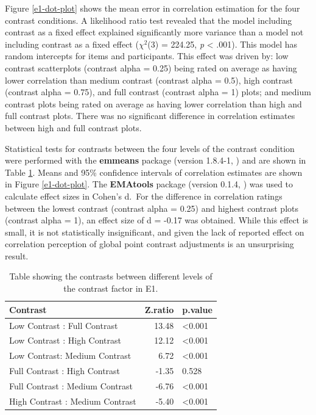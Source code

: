 \documentclass[preprint, 3p,
authoryear]{elsarticle} %
\begin{document}
Figure \ref{e1-dot-plot} shows the mean error in correlation estimation
for the four contrast conditions. A likelihood ratio test revealed that
the model including contrast as a fixed effect explained significantly
more variance than a model not including contrast as a fixed effect
(\(\chi^2\)(3) = 224.25, \emph{p} \textless{} .001). This model has
random intercepts for items and participants. This effect was driven by:
low contrast scatterplots (contrast alpha = 0.25) being rated on average
as having lower correlation than medium contrast (contrast alpha = 0.5),
high contrast (contrast alpha = 0.75), and full contrast (contrast alpha
= 1) plots; and medium contrast plots being rated on average as having
lower correlation than high and full contrast plots. There was no
significant difference in correlation estimates between high and full
contrast plots.

Statistical tests for contrasts between the four levels of the contrast
condition were performed with the \textbf{emmeans} package (version
1.8.4-1, \citealp{emmeans}) and are shown in Table
\ref{contrasts-table-e1}. Means and 95\% confidence intervals of
correlation estimates are shown in Figure \ref{e1-dot-plot}. The
\textbf{EMAtools} package (version 0.1.4, \citealp{ematools}) was used
to calculate effect sizes in Cohen's d.~For the difference in
correlation ratings between the lowest contrast (contrast alpha = 0.25)
and highest contrast plots (contrast alpha = 1), an effect size of d =
-0.17 was obtained. While this effect is small, it is not statistically
insignificant, and given the lack of reported effect on correlation
perception of global point contrast adjustments \citep{rensink_2012} is
an unsurprising result.

\begin{table}

\caption{\label{tab:contrasts-table-e1}\label{contrasts-table-e1}Table showing the contrasts between different levels of the contrast factor in E1.}
\centering
\begin{tabular}[t]{lrl}
\toprule
Contrast & Z.ratio & p.value\\
\midrule
Low Contrast : Full Contrast & 13.48 & <0.001\\
Low Contrast : High Contrast & 12.12 & <0.001\\
Low Contrast: Medium Contrast & 6.72 & <0.001\\
Full Contrast : High Contrast & -1.35 & 0.528\\
Full Contrast : Medium Contrast & -6.76 & <0.001\\
\addlinespace
High Contrast : Medium Contrast & -5.40 & <0.001\\
\bottomrule
\end{tabular}
\end{table}
\end{document}
